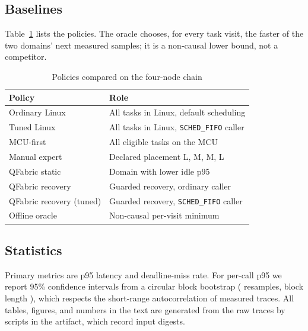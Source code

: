 \documentclass[conference]{IEEEtran}
\newcommand{\system}{QFabric\xspace}
\begin{document}
\subsection{Baselines}
Table~\ref{tab:baselines} lists the policies. The oracle chooses, for every
task visit, the faster of the two domains' next measured samples; it is a
non-causal lower bound, not a competitor.

\begin{table}[t]
\caption{Policies compared on the four-node chain}
\label{tab:baselines}
\centering
\small
\begin{tabular}{lp{4.3cm}}
\toprule
Policy & Role \\
\midrule
Ordinary Linux & All tasks in Linux, default scheduling \\
Tuned Linux & All tasks in Linux, \texttt{SCHED\_FIFO} caller \\
MCU-first & All eligible tasks on the MCU \\
Manual expert & Declared placement L, M, M, L \\
\system static & Domain with lower idle p95 \\
\system recovery & Guarded recovery, ordinary caller \\
\system recovery (tuned) & Guarded recovery, \texttt{SCHED\_FIFO} caller \\
Offline oracle & Non-causal per-visit minimum \\
\bottomrule
\end{tabular}
\end{table}

\subsection{Statistics}
Primary metrics are p95 latency and deadline-miss rate. For per-call p95 we
report 95\% confidence intervals from a circular block bootstrap
(\StageTwelveBootstrapResamples{} resamples, block length
\StageTwelveBootstrapBlock), which respects the short-range autocorrelation of
measured traces. All tables, figures, and numbers in the text are generated
from the raw traces by scripts in the artifact, which record input digests.
\end{document}

